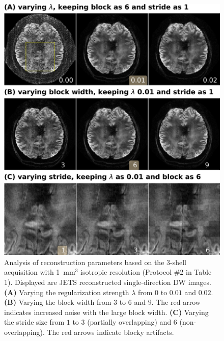 \documentclass[a4paper,11pt,twoside]{report}
\begin{document}
    \begin{figure}
        \includegraphics[width=\textwidth]{../figures/supp_fig7.png}
        \caption{Analysis of reconstruction parameters based on
        the 3-shell acquisition with 1~mm$^3$ isotropic resolution
        (Protocol \#2 in Table 1).
        Displayed are JETS reconstructed single-direction DW images.
        \textbf{(A)} Varying the regularization strength $\lambda$
        from $0$ to $0.01$ and $0.02$.
        \textbf{(B)} Varying the block width from $3$ to $6$ and $9$.
        The red arrow indicates increased noise
        with the large block width.
        \textbf{(C)} Varying the stride size from $1$ to
        $3$ (partially overlapping) and
        $6$ (non-overlapping).
        The red arrows indicate blocky artifacts.}
        \label{SUPPFIG:7}
    \end{figure}
\end{document}
